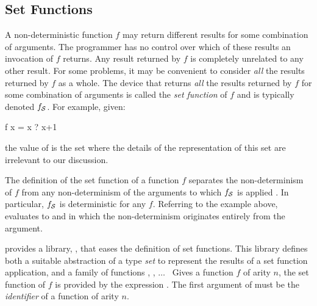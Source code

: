\newcommand{\funset}[1]{#1\ensuremath{_{\cal S}}}
\subsection{Set Functions}
\label{Set Functions}

A non-deterministic function $f$ may return different results for
some combination of arguments.  The programmer has no control over
which of these results an invocation of $f$ returns.
Any result returned by $f$ is completely unrelated to any other result.
For some problems, it may be convenient to consider \emph{all}
the results returned by $f$ as a whole.
The device that returns \emph{all} the results returned by $f$
for some combination of arguments is called the \emph{set function} of $f$
and is typically denoted $\funset f$.
For example, given:
%
\begin{prog}
  f x = x ? x+1
\end{prog}
%
the value of \code{\funset{f} x} is the set 
where the details of the representation of this set are irrelevant to our
discussion.

The definition of the set function of a function $f$
separates the non-determinism of $f$ from any non-determinism
of the arguments to which $\funset{f}$ is applied \cite{AntoyHanus09PPDP}.
In particular, $\funset{f}$ is deterministic for any $f$.
Referring to the example above, \code{\funset{f} (2\,?\,4)} evaluates
to  and  in which the non-determinism
originates entirely from the argument.

\pakcs{} provides a library, ,
that eases the definition of set functions.
This library defines both a suitable abstraction of a type \emph{set}
to represent the results of a set function application, and
a family of functions , , $\ldots$~
Gives a function $f$ of arity $n$,
the set function of $f$ is provided by the expression .
The first argument of  must be the \emph{identifier}
of a function of arity $n$.

